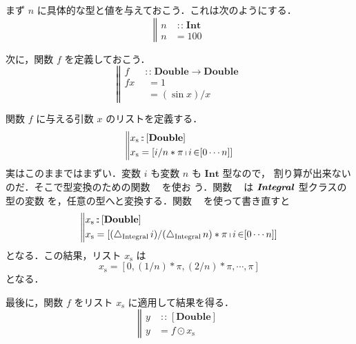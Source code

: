 \documentclass[a5paper,twoside,fleqn,draft]{jsbook}
\newcommand{\mBrace}{\Vert}
\newcommand{\mKeyword}[1]{\mathsf{#1}}
\newcommand{\mOtherwiseKeyword}{\mKeyword{otherwise}}
\DeclareMathOperator{\mOtherwise}{\mOtherwiseKeyword}
\newcommand{\mUpCast}{\bigtriangleup}
\DeclareMathOperator{\mFromIntegral}{\mUpCast_\text{Integral}}
\DeclareMathOperator{\mFrom}{\in}
\DeclareMathOperator{\mFuncArrow}{\rightarrow}
\DeclareMathOperator{\mIn}{{:\!:}}
\DeclareMathOperator{\mMapList}{\odot}
\newcommand{\mType}[1]{\mathbf{#1}} %
\newcommand{\mDoubleType}{\mType{Double}}
\newcommand{\mIntType}{\mType{Int}}
\newcommand{\mTypeClass}[1]{\textbf{\textit{#1}}}
\newcommand{\mIntegralTypeClass}{\mTypeClass{Integral}}
\newcommand{\mList}[1]{{#1}_\mathrm{s}}
\newcommand{\mGuard}[1]{\mathop{\mid_{#1}}}
\DeclareMathOperator{\mListComp}{\shortmid}
\newcommand{\mProjEXP}[2]{#1\mFuncArrow#2} %
\begin{document}
まず $n$ に具体的な型と値を与えておこう．これは次のようにする．
\begin{equation}
\left\mBrace
\begin{aligned}
n&\mIn\mIntType\\
n&=100
\end{aligned}
\right.
\end{equation}

次に，関数 $f$ を定義しておこう．
\begin{equation}
\left\mBrace
\begin{aligned}
f&\mIn\mProjEXP{\mDoubleType}{\mDoubleType}\\
fx&\mGuard{x\equiv0}=1\\
&\mGuard{\mOtherwise}=(\sin x)/x
\end{aligned}
\right.
\end{equation}

関数 $f$ に与える引数 $x$ のリストを定義する．
\begin{equation*}
  \left\mBrace
  \begin{aligned}
    \mList{x}
    &\mIn{}[\mDoubleType]\\
    \mList{x}
    &=[i/n*\pi\mListComp i\mFrom[0\dotsb n]]
  \end{aligned}
  \right.
\end{equation*}
実はこのままではまずい．変数 $i$ も変数 $n$ も $\mIntType$ 型なので，
割り算が出来ないのだ．そこで型変換のための関数 $\mFromIntegral$ を使お
う．関数 $\mFromIntegral$ は $\mIntegralTypeClass$ 型クラスの型の変数
を，任意の型へと変換する．関数 $\mFromIntegral$ を使って書き直すと
\begin{equation}
  \left\mBrace
  \begin{aligned}
    \mList{x}
    &\mIn{}[\mDoubleType]\\
    \mList{x}
    &=[(\mFromIntegral i)/(\mFromIntegral n)*\pi\mListComp i\mFrom[0\dotsb n]]
  \end{aligned}
  \right.
\end{equation}
となる．この結果，リスト $\mList{x}$ は
\begin{equation}
  \mList{x}
  =[0,(1/n)*\pi,(2/n)*\pi,\dotsb,\pi]
\end{equation}
となる．

最後に，関数 $f$ をリスト $\mList{x}$ に適用して結果を得る．
\begin{equation}
  \left\mBrace
  \begin{aligned}
    y
    &\mIn{}[\mDoubleType]\\
    y
    &=f\mMapList\mList{x}
  \end{aligned}
  \right.
\end{equation}
\end{document}
